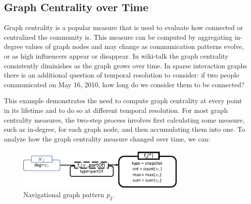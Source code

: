 \subsection{ Graph Centrality over Time} 

Graph centrality is a popular measure that is used to evaluate how
connected or centralized the community is.  This measure can be
computed by aggregating in-degree values of graph nodes and may change
as communication patterns evolve, or as high influencers appear or
disappear.  In wiki-talk the graph centrality consistently diminishes
as the graph grows over time.  In sparse interaction graphs there is
an additional question of temporal resolution to consider: if two
people communicated on May 16, 2010, how long do we consider them to
be connected?

This example demonstrates the need to compute graph centrality at
every point in its lifetime and to do so at different temporal
resolution.  For most graph centrality measures, the two-step process
involves first calculating some measure, such as in-degree, for each
graph node, and then accumulating them into one.  
To analyze how the graph centrality measure changed over time, we can:

\begin{figure}
\centering
\includegraphics[width=3.3in]{figs/snapshotncr.pdf}
\caption{Navigational graph pattern $p_2$.}
\vspace{-0.2cm}
\label{fig:snapshotncr}
\vspace{-0.2cm}
\end{figure}

